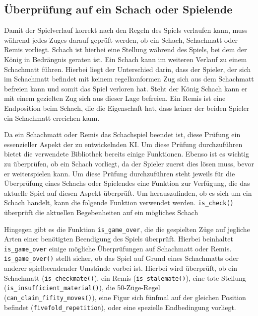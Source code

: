     \subsection{Überprüfung auf ein Schach oder
Spielende}\label{uxfcberpruxfcfung-auf-ein-schach-oder-spielende}

Damit der Spielverlauf korrekt nach den Regeln des Spiels verlaufen
kann, muss während jedes Zuges darauf geprüft werden, ob ein Schach,
Schachmatt oder Remis vorliegt. Schach ist hierbei eine Stellung während
des Spiels, bei dem der König in Bedrängnis geraten ist. Ein Schach kann
im weiteren Verlauf zu einem Schachmatt führen. Hierbei liegt der
Unterschied darin, dass der Spieler, der sich im Schachmatt befindet mit
keinem regelkonformen Zug sich aus dem Schachmatt befreien kann und
somit das Spiel verloren hat. Steht der König Schach kann er mit einem
gezielten Zug sich aus dieser Lage befreien. Ein Remis ist eine
Endposition beim Schach, die die Eigenschaft hat, dass keiner der beiden
Spieler ein Schachmatt erreichen kann.

Da ein Schachmatt oder Remis das Schachspiel beendet ist, diese Prüfung
ein essenzieller Aspekt der zu entwickelnden KI. Um diese Prüfung
durchzuführen bietet die verwendete Bibliothek bereits einige
Funktionen. Ebenso ist es wichtig zu überprüfen, ob ein Schach vorliegt,
da der Spieler zuerst dies lösen muss, bevor er weiterspielen kann. Um
diese Prüfung durchzuführen steht jeweils für die Überprüfung eines
Schachs oder Spielendes eine Funktion zur Verfügung, die das aktuelle
Spiel auf diesen Aspekt überprüft. Um herauszufinden, ob es sich um ein
Schach handelt, kann die folgende Funktion verwendet werden.
\texttt{is\_check()} überprüft die aktuellen Begebenheiten auf ein
mögliches Schach

Hingegen gibt es die Funktion \texttt{is\_game\_over}, die die
gespielten Züge auf jegliche Arten einer benötigten Beendigung des
Spiels überprüft. Hierbei beinhaltet \texttt{is\_game\_over} einige
mögliche Überprüfungen auf Schachmatt oder Remis.
\texttt{is\_game\_over()} stellt sicher, ob das Spiel auf Grund eines
Schachmatts oder anderer spielbeendender Umstände vorbei ist. Hierbei
wird überprüft, ob ein Schachmatt (\texttt{is\_checkmate()}), ein Remis
(\texttt{is\_stalemate()}), eine tote Stellung
(\texttt{is\_insufficient\_material()}), die 50-Züge-Regel
(\texttt{can\_claim\_fifity\_moves()}), eine Figur sich fünfmal auf der gleichen
Position befindet (\texttt{fivefold\_repetition}), oder eine
spezielle Endbedingung vorliegt.

